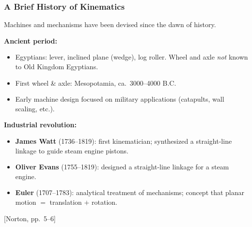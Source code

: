 \documentclass[10pt,aspectratio=43]{beamer}
\newcommand{\pref}[1]{\vfill\hfill{\scriptsize\color{gray}[Norton, pp.~#1]}}
\begin{document}

\begin{frame}
\frametitle{A Brief History of Kinematics}

Machines and mechanisms have been devised since the dawn of history.

\vspace{4pt}
\textbf{Ancient period:}
\begin{itemize}
  \item Egyptians: lever, inclined plane (wedge), log roller. Wheel and axle \emph{not} known to Old Kingdom Egyptians.
  \item First wheel \& axle: Mesopotamia, ca.\ 3000--4000 B.C.
  \item Early machine design focused on military applications (catapults, wall scaling, etc.).
\end{itemize}

\vspace{4pt}
\textbf{Industrial revolution:}
\begin{itemize}
  \item \textbf{James Watt} (1736--1819): first kinematician; synthesized a straight-line linkage to guide steam engine pistons.
  \item \textbf{Oliver Evans} (1755--1819): designed a straight-line linkage for a steam engine.
  \item \textbf{Euler} (1707--1783): analytical treatment of mechanisms; concept that planar motion $=$ translation $+$ rotation.
\end{itemize}
\pref{5--6}
\end{frame}
\end{document}
